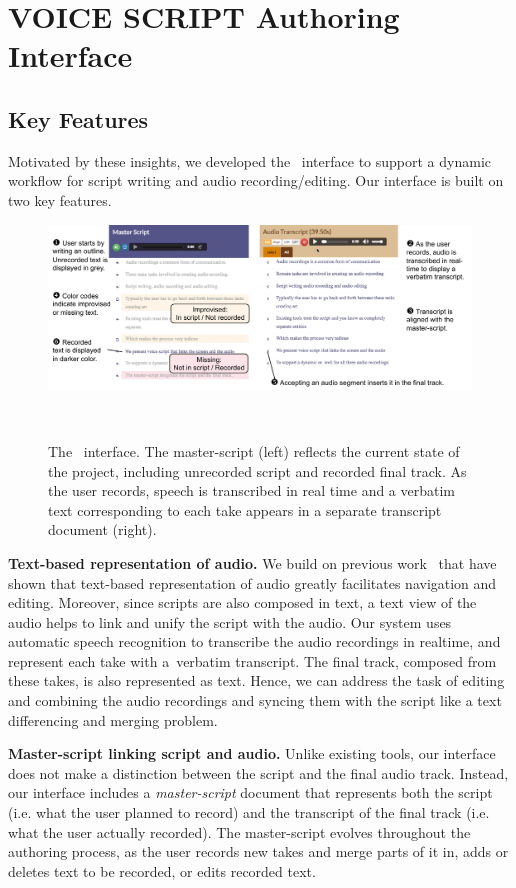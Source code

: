 \section{VOICE SCRIPT Authoring Interface}

\subsection{Key Features} Motivated by these insights, we developed the \systemname\  interface to support a dynamic workflow for script writing and  audio recording/editing. Our interface is built on two key features. 

\begin{figure}
  \centering
  \includegraphics[width=2.0\columnwidth]{figures/ui_aligned}
  \caption{The \systemname\ interface. The master-script (left)  reflects the current state of
the project, including unrecorded script and recorded final track. As the user records, speech is transcribed in real
time and a verbatim text corresponding to each take appears in
a separate transcript document (right).}~\label{fig:ui_aligned}
\end{figure}

\textbf{Text-based representation of audio.} We build on previous work~\cite{casares2002simplifying,whittaker2004semantic,berthouzoz2012tools,rubin2013content} that have shown that text-based representation of audio greatly facilitates navigation and editing. Moreover, since scripts are also composed in text, a text view of the audio  helps to link and unify the script
with the audio.
 Our system uses automatic speech recognition to transcribe the audio recordings in realtime, and represent each take with a\ verbatim transcript. The final track, composed from these takes, is also represented as text. Hence, we can address the task of editing and combining the audio recordings and syncing them with the script like a text differencing and merging problem. 

\textbf{Master-script linking script and audio.} Unlike existing tools, our interface does not make a distinction between the script and the final audio track. Instead, our interface includes a \textit{master-script} document that represents both the script (i.e. what the user planned to record) and the transcript of the final track (i.e. what the user actually recorded). The master-script evolves throughout the authoring process, as the user records new takes and merge parts of it in, adds or deletes text to be recorded, or edits recorded text. 

